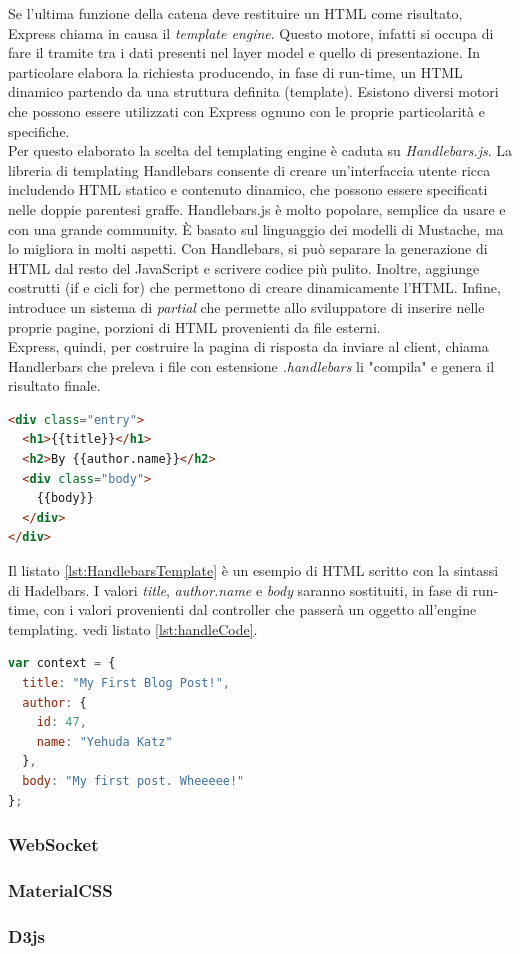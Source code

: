 Se l'ultima funzione della catena deve restituire un HTML come risultato, Express chiama in causa il \textit{template engine}. Questo motore, infatti si occupa di fare il tramite tra i dati presenti nel layer model e quello di presentazione. In particolare elabora la richiesta producendo, in fase di run-time, un HTML dinamico partendo da una struttura definita (template). Esistono diversi motori che possono essere utilizzati con Express ognuno con le proprie particolarità e specifiche. 
\\Per questo elaborato la scelta del templating engine è caduta su \textit{Handlebars.js}. La libreria di templating Handlebars consente di creare un'interfaccia utente ricca includendo HTML statico e contenuto dinamico, che possono essere specificati nelle doppie parentesi graffe. Handlebars.js è molto popolare, semplice da usare e con una grande community. È basato sul linguaggio dei modelli di Mustache, ma lo migliora in molti aspetti. Con Handlebars, si può separare la generazione di HTML dal resto del JavaScript e scrivere codice più pulito. Inoltre, aggiunge costrutti (if e cicli for) che permettono di creare dinamicamente l'HTML. Infine, introduce un sistema di \textit{partial} che permette allo sviluppatore di inserire nelle proprie pagine, porzioni di HTML provenienti da file esterni. 
\\Express, quindi, per costruire la pagina di risposta da inviare al client, chiama Handlerbars che preleva i file con estensione \textit{.handlebars} li "compila" e genera il risultato finale.

\begin{lstlisting}[language=HTML, label=lst:HandlebarsTemplate, caption={Esempio di HTML scritto con Handlebars.}]
<div class="entry">
  <h1>{{title}}</h1>
  <h2>By {{author.name}}</h2>
  <div class="body">
    {{body}}
  </div>
</div>
\end{lstlisting} 

Il listato \ref{lst:HandlebarsTemplate} è un esempio di HTML scritto con la sintassi di Hadelbars. I valori \textit{title}, \textit{author.name} e \textit{body} saranno sostituiti, in fase di run-time, con i valori provenienti dal controller che passerà un oggetto all'engine templating. vedi listato \ref{lst:handleCode}.

\begin{lstlisting}[language=Javascript, label=lst:handleCode, caption={Esempio di variabile passata dal controller al template engine.}]
var context = {
  title: "My First Blog Post!",
  author: {
    id: 47,
    name: "Yehuda Katz"
  },
  body: "My first post. Wheeeee!"
};
\end{lstlisting} 

\subsubsection{WebSocket}
\label{sec:WebSocket}

\subsubsection{MaterialCSS}
\label{sec:materialCSS}

\subsubsection{D3js}
\label{sec:d3js}